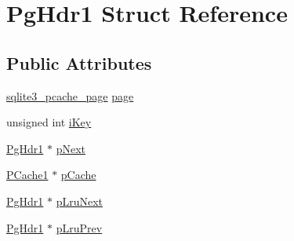 \hypertarget{struct_pg_hdr1}{\section{Pg\-Hdr1 Struct Reference}
\label{struct_pg_hdr1}
}
\subsection*{Public Attributes}
\begin{DoxyCompactItemize}
\item 
\hyperlink{structsqlite3__pcache__page}{sqlite3\-\_\-pcache\-\_\-page} \hyperlink{struct_pg_hdr1_a121a9abbfea6b112ba77eeb84391ed47}{page}
\item 
unsigned int \hyperlink{struct_pg_hdr1_ad122ef74f5f0137414882aabd111a01b}{i\-Key}
\item 
\hyperlink{struct_pg_hdr1}{Pg\-Hdr1} $\ast$ \hyperlink{struct_pg_hdr1_acde43ab0ed0fbba33e526058d9c343b9}{p\-Next}
\item 
\hyperlink{struct_p_cache1}{P\-Cache1} $\ast$ \hyperlink{struct_pg_hdr1_aa5b23de466773e72e1b6edf07b3a4570}{p\-Cache}
\item 
\hyperlink{struct_pg_hdr1}{Pg\-Hdr1} $\ast$ \hyperlink{struct_pg_hdr1_ae22cfc3a39fe029a8f8fdd70e7ca4055}{p\-Lru\-Next}
\item 
\hyperlink{struct_pg_hdr1}{Pg\-Hdr1} $\ast$ \hyperlink{struct_pg_hdr1_adf220ef63d6ceb782ac87a08aeb1722d}{p\-Lru\-Prev}
\end{DoxyCompactItemize}


